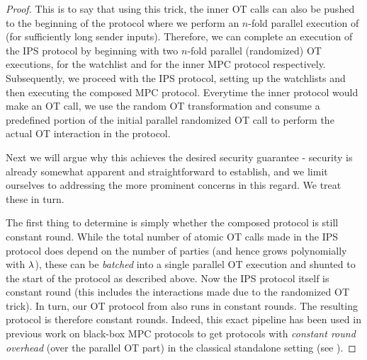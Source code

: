 \begin{proof}
    This is to say that using this trick, the inner OT calls can also be pushed to the beginning of the protocol where we perform an $n$-fold parallel execution of  (for sufficiently long sender inputs). Therefore, we can complete an execution of the IPS protocol by beginning with two $n$-fold parallel (randomized) OT executions, for the watchlist and for the inner MPC protocol respectively. Subsequently, we proceed with the IPS protocol, setting up the watchlists and then executing the composed MPC protocol. Everytime the inner protocol would make an OT call, we use the random OT transformation and consume a predefined portion of the initial parallel randomized OT call to perform the actual OT interaction in the protocol. 
    
    
    Next we will argue why this achieves the desired security guarantee - security is already somewhat apparent and straightforward to establish, and we limit ourselves to addressing the more prominent concerns in this regard. We treat these in turn. 

     The first thing to determine is simply whether the composed protocol is still constant round. While the total number of atomic OT calls made in the IPS protocol does depend on the number of parties (and hence grows polynomially with $\lambda$), these can be \emph{batched} into a single parallel OT execution and shunted to the start of the protocol as described above. Now the IPS protocol itself is constant round (this includes the interactions made due to the randomized OT trick). In turn, our OT protocol from  also runs in constant rounds. The resulting protocol is therefore constant rounds. Indeed, this exact pipeline has been used in previous work on black-box MPC protocols to get protocols with {\em constant round overhead} (over the parallel OT part) in the classical standalone setting (see \cite{FOCS:Wee10,STOC:Goyal11}). 


\end{proof}
